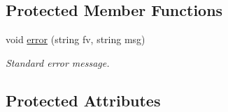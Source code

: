 \subsection*{Protected Member Functions}
\begin{DoxyCompactItemize}
\item 
void \hyperlink{class_agelem_acf0a31790483a62b9b1f46a2bd73b59a}{error} (string fv, string msg)\hypertarget{class_agelem_acf0a31790483a62b9b1f46a2bd73b59a}{}\label{class_agelem_acf0a31790483a62b9b1f46a2bd73b59a}

\begin{DoxyCompactList}\small\item\em Standard error message. \end{DoxyCompactList}\end{DoxyCompactItemize}
\subsection*{Protected Attributes}
